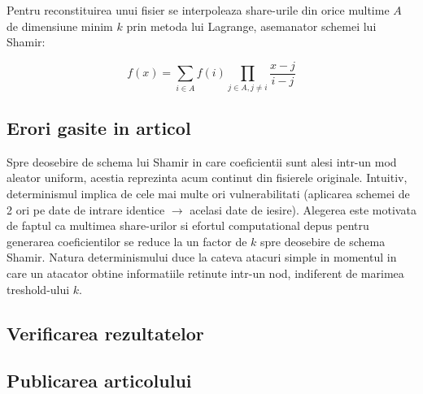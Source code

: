 \documentclass{llncs}
\begin{document}
Pentru reconstituirea unui fisier se interpoleaza share-urile din orice multime $A$ de dimensiune minim $k$ prin metoda lui Lagrange, asemanator schemei lui Shamir:

\begin{equation}
	f(x)=\sum_{i \in A} f(i) \prod_{j \in A, j \neq i} \frac{x-j}{i-j}
\end{equation}

\subsection{Erori gasite in articol}


Spre deosebire de schema lui Shamir in care coeficientii sunt alesi intr-un mod aleator uniform, acestia
reprezinta acum continut din fisierele originale.
Intuitiv, determinismul implica de cele mai multe ori vulnerabilitati (aplicarea schemei de 2 ori pe date de intrare identice $\rightarrow$ acelasi date de iesire).
Alegerea este motivata de faptul ca multimea share-urilor si efortul computational depus pentru generarea coeficientilor se reduce la un factor de $k$ spre deosebire de schema Shamir. Natura determinismului duce la cateva atacuri simple in momentul in care un atacator obtine informatiile retinute intr-un nod, indiferent de marimea treshold-ului $k$.


\subsection{Verificarea rezultatelor}
\subsection{Publicarea articolului}

%
%
%



\end{document}
